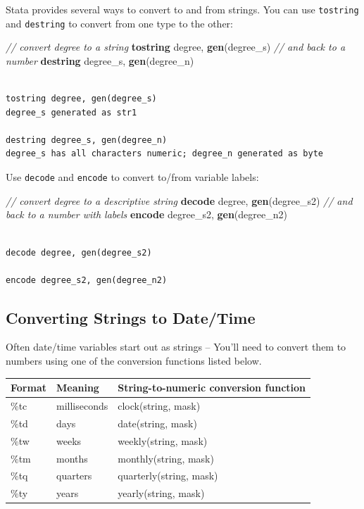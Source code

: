 \documentclass[
]{book}
\newenvironment{Shaded}{\begin{snugshade}}{\end{snugshade}}
\newcommand{\CommentTok}[1]{\textcolor[rgb]{0.56,0.35,0.01}{\textit{#1}}}
\newcommand{\KeywordTok}[1]{\textcolor[rgb]{0.13,0.29,0.53}{\textbf{#1}}}
\newcommand{\NormalTok}[1]{#1}
\begin{document}
Stata provides several ways to convert to and from strings. You can use \texttt{tostring} and \texttt{destring} to convert from one type to the other:

\begin{Shaded}
\begin{Highlighting}[]
  \CommentTok{// convert degree to a string}
  \KeywordTok{tostring}\NormalTok{ degree, }\KeywordTok{gen}\NormalTok{(degree_s)}
  \CommentTok{// and back to a number}
  \KeywordTok{destring}\NormalTok{ degree_s, }\KeywordTok{gen}\NormalTok{(degree_n)}
\end{Highlighting}
\end{Shaded}

\begin{verbatim}

tostring degree, gen(degree_s)
degree_s generated as str1

destring degree_s, gen(degree_n)
degree_s has all characters numeric; degree_n generated as byte
\end{verbatim}

Use \texttt{decode} and \texttt{encode} to convert to/from variable labels:

\begin{Shaded}
\begin{Highlighting}[]
  \CommentTok{// convert degree to a descriptive string}
  \KeywordTok{decode}\NormalTok{ degree, }\KeywordTok{gen}\NormalTok{(degree_s2)}
  \CommentTok{// and back to a number with labels}
  \KeywordTok{encode}\NormalTok{ degree_s2, }\KeywordTok{gen}\NormalTok{(degree_n2)}
\end{Highlighting}
\end{Shaded}

\begin{verbatim}

decode degree, gen(degree_s2)

encode degree_s2, gen(degree_n2)
\end{verbatim}

\hypertarget{converting-strings-to-datetime}{%
\subsection{Converting Strings to Date/Time}\label{converting-strings-to-datetime}}

Often date/time variables start out as strings -- You'll need to convert them to numbers using one of the conversion functions listed below.

\begin{longtable}[]{@{}lll@{}}
\toprule
Format & Meaning & String-to-numeric conversion function\tabularnewline
\midrule
\endhead
\%tc & milliseconds & clock(string, mask)\tabularnewline
\%td & days & date(string, mask)\tabularnewline
\%tw & weeks & weekly(string, mask)\tabularnewline
\%tm & months & monthly(string, mask)\tabularnewline
\%tq & quarters & quarterly(string, mask)\tabularnewline
\%ty & years & yearly(string, mask)\tabularnewline
\bottomrule
\end{longtable}
\end{document}
